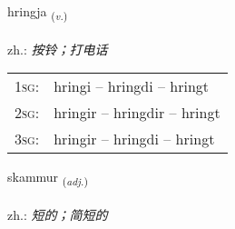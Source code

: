 \documentclass[frontgrid, backgrid]{flacards}\usepackage[]{graphicx}\usepackage[]{xcolor}
\begin{document}
\renewcommand{\flhead}{\vskip5pt \fboxsep=0pt {\small\bfseries\footnotesize Sagnorð | 动词}}
\renewcommand{\fcfoot}{\vskip5pt \fboxsep=0pt \hspace{2pt}{\small\bfseries\footnotesize 1K}}

\renewcommand{\blhead}{\vskip5pt {\small\bfseries\footnotesize Sagnorð | 动词 }}
\renewcommand{\bcfoot}{\vskip5pt \hspace{2pt}{\small\bfseries\footnotesize 1K}}


{hringja \small{\textsubscript{(\textit{v.})}} \\[1ex] %
\textphonetic{[r̥iɲca]} \\
zh.: \emph{按铃；打电话} \\  [2ex]
\renewcommand*{\arraystretch}{0.8}
\begin{tabular}{p{1cm}l}
\textsc{1sg}: & hringi -- hringdi -- hringt \\ 
\textsc{2sg}: & hringir -- hringdir -- hringt \\ 
\textsc{3sg}: & hringir -- hringdi -- hringt \\ 
\end{tabular}
}

\renewcommand{\flhead}{\vskip5pt \fboxsep=0pt {\small\bfseries\footnotesize Lýsingarorð | 形容词}}
\renewcommand{\fcfoot}{\vskip5pt \fboxsep=0pt \hspace{2pt}{\small\bfseries\footnotesize 1K}}

\renewcommand{\blhead}{\vskip5pt {\small\bfseries\footnotesize Lýsingarorð | 形容词 }}
\renewcommand{\bcfoot}{\vskip5pt \hspace{2pt}{\small\bfseries\footnotesize 1K}}


{skammur \small{\textsubscript{(\textit{adj.})}} \\[1ex] %
\textphonetic{[skamʏr]} \\
zh.: \emph{短的；简短的} \\  [2ex]
\renewcommand*{\arraystretch}{0.8}
}
\end{document}

